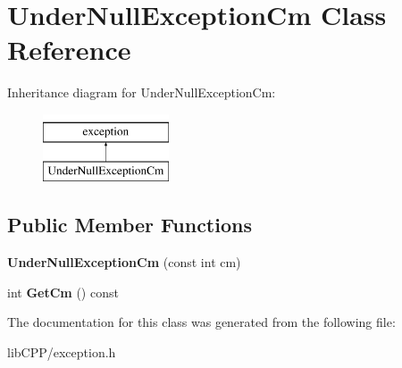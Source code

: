 \hypertarget{classUnderNullExceptionCm}{\section{Under\-Null\-Exception\-Cm Class Reference}
\label{classUnderNullExceptionCm}
}
Inheritance diagram for Under\-Null\-Exception\-Cm\-:\begin{figure}[H]
\begin{center}
\leavevmode
\includegraphics[height=2.000000cm]{classUnderNullExceptionCm}
\end{center}
\end{figure}
\subsection*{Public Member Functions}
\begin{DoxyCompactItemize}
\item 
\hypertarget{classUnderNullExceptionCm_a0a7dde2dc30c17111dff2fa6325f48bc}{{\bfseries Under\-Null\-Exception\-Cm} (const int cm)}\label{classUnderNullExceptionCm_a0a7dde2dc30c17111dff2fa6325f48bc}

\item 
\hypertarget{classUnderNullExceptionCm_a7a1a964ead8846f28ef1de10015c07c7}{int {\bfseries Get\-Cm} () const }\label{classUnderNullExceptionCm_a7a1a964ead8846f28ef1de10015c07c7}

\end{DoxyCompactItemize}


The documentation for this class was generated from the following file\-:\begin{DoxyCompactItemize}
\item 
lib\-C\-P\-P/exception.\-h\end{DoxyCompactItemize}
